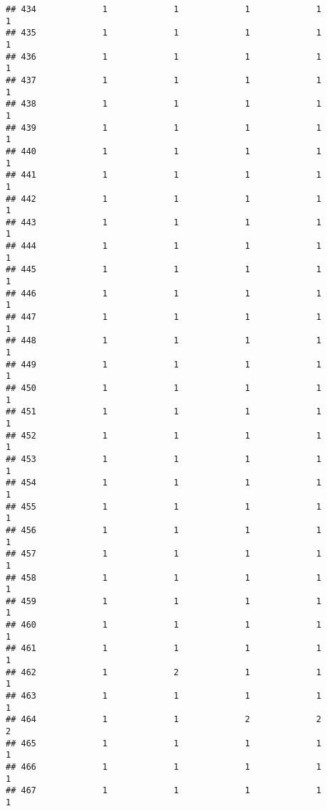 \documentclass[
]{article}
\begin{document}
\begin{verbatim}
## 434             1             1             1             1             1
## 435             1             1             1             1             1
## 436             1             1             1             1             1
## 437             1             1             1             1             1
## 438             1             1             1             1             1
## 439             1             1             1             1             1
## 440             1             1             1             1             1
## 441             1             1             1             1             1
## 442             1             1             1             1             1
## 443             1             1             1             1             1
## 444             1             1             1             1             1
## 445             1             1             1             1             1
## 446             1             1             1             1             1
## 447             1             1             1             1             1
## 448             1             1             1             1             1
## 449             1             1             1             1             1
## 450             1             1             1             1             1
## 451             1             1             1             1             1
## 452             1             1             1             1             1
## 453             1             1             1             1             1
## 454             1             1             1             1             1
## 455             1             1             1             1             1
## 456             1             1             1             1             1
## 457             1             1             1             1             1
## 458             1             1             1             1             1
## 459             1             1             1             1             1
## 460             1             1             1             1             1
## 461             1             1             1             1             1
## 462             1             2             1             1             1
## 463             1             1             1             1             1
## 464             1             1             2             2             2
## 465             1             1             1             1             1
## 466             1             1             1             1             1
## 467             1             1             1             1             1

\end{verbatim}
\end{document}
